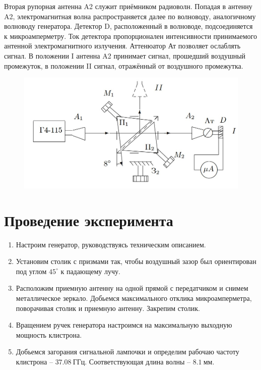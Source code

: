 \documentclass[14pt, a4paper]{report}
\begin{document}
Вторая рупорная антенна A2 служит приёмником радиоволн. Попадая в антенну A2, электромагнитная волна распространяется далее по волноводу, аналогичному волноводу генератора. Детектор D, расположенный в волноводе, подсоединяется к микроамперметру. Ток детектора пропорционален интенсивности принимаемого антенной электромагнитного излучения. Аттенюатор Ат позволяет ослаблять сигнал. В положении I антенна A2 принимает сигнал, прошедший воздушный промежуток, в положении II сигнал, отражённый от воздушного промежутка.

\begin{figure}[H]
\centering
\includegraphics[scale=0.5]{../images/462_6}
\end{figure}

\section{Проведение эксперимента}

\begin{enumerate}

\setcounter{enumi}{0}

\item Настроим генератор, руководствуясь техническим описанием.

\item Установим столик с призмами так, чтобы воздушный зазор был ориентирован под углом $45^\circ$ к падающему лучу.
 
\item Расположим приемную антенну на одной прямой с передатчиком и снимем металлическое зеркало. Добьемся максимального отклика микроамперметра, поворачивая столик и приемную антенну. Закрепим столик.

\item Вращением ручек генератора настроимся на максимальную выходную мощность клистрона.

\item Добьемся загорания сигнальной лампочки и определим рабочаю частоту клистрона -- $37.08\ ГГц$. Соответствующая длина волны -- $8.1\ мм$.

\end{enumerate}
\end{document}

